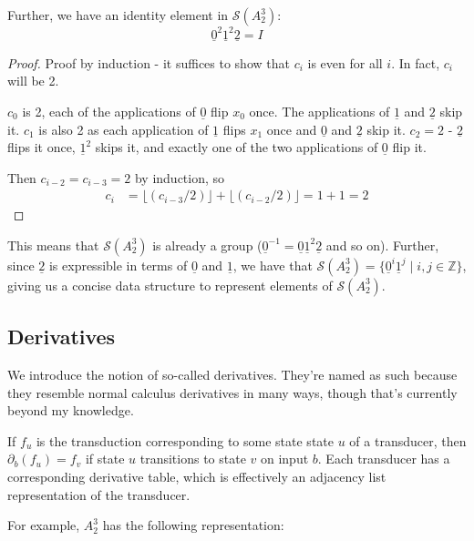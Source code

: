 \documentclass{article}
\newcommand{\0}{\underline{0}}
\newcommand{\1}{\underline{1}}
\newcommand{\2}{\underline{2}}
\newcommand{\Z}{\mathbb{Z}}
\renewcommand{\S}{\mathcal{S}}
\begin{document}
Further, we have an identity element in $\S(A^3_2)$: $$\0^2\1^2\2 = I$$
\begin{proof}
Proof by induction - it suffices to show that $c_i$ is even for all $i$. In fact, $c_i$ will be 2.

$c_0$ is 2, each of the applications of $\0$ flip $x_0$ once. The applications of $\1$ and $\2$ skip it. $c_1$ is also 2 as each application of $\1$ flips $x_1$ once and $\0$ and $\2$ skip it. $c_2 = 2$ - $\2$ flips it once, $\1^2$ skips it, and exactly one of the two applications of $\0$ flip it.

Then $c_{i-2} = c_{i-3} = 2$ by induction, so
\begin{align*}
c_i &= \lfloor (c_{i-3} / 2) \rfloor + \lfloor (c_{i-2} / 2) \rfloor = 1 + 1 = 2
\end{align*}
\end{proof}
This means that $\S(A^3_2)$ is already a group ($\0^{-1} = \0\1^2\2$ and so on). Further, since $\2$ is expressible in terms of $\0$ and $\1$, we have that $\S(A^3_2) = \{ \0^i \1^j \mid i, j \in \Z \}$, giving us a concise data structure to represent elements of $\S(A^3_2)$.


\subsection*{Derivatives}
We introduce the notion of so-called derivatives. They're named as such because they resemble normal calculus derivatives in many ways, though that's currently beyond my knowledge.

If $f_u$ is the transduction corresponding to some state state $u$ of a transducer, then $\partial_b(f_u) = f_v$ if state $u$ transitions to state $v$ on input $b$. Each transducer has a corresponding derivative table, which is effectively an adjacency list representation of the transducer.

For example, $A^3_2$ has the following representation:
\end{document}
